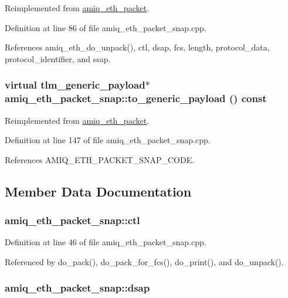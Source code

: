 Reimplemented from \hyperlink{classamiq__eth__packet_a909eb3860185125564fa530496ed1c9e}{amiq\_\-eth\_\-packet}.

Definition at line 86 of file amiq\_\-eth\_\-packet\_\-snap.cpp.

References amiq\_\-eth\_\-do\_\-unpack(), ctl, dsap, fcs, length, protocol\_\-data, protocol\_\-identifier, and ssap.\hypertarget{classamiq__eth__packet__snap_a99256008f171d933ec625d7957b64270}{
\subsubsection[{to\_\-generic\_\-payload}]{\setlength{\rightskip}{0pt plus 5cm}virtual tlm\_\-generic\_\-payload$\ast$ amiq\_\-eth\_\-packet\_\-snap::to\_\-generic\_\-payload () const}}
\label{classamiq__eth__packet__snap_a99256008f171d933ec625d7957b64270}


Reimplemented from \hyperlink{classamiq__eth__packet_a6dd92751d8172eeaa347d71bb415b0d5}{amiq\_\-eth\_\-packet}.

Definition at line 147 of file amiq\_\-eth\_\-packet\_\-snap.cpp.

References AMIQ\_\-ETH\_\-PACKET\_\-SNAP\_\-CODE.

\subsection{Member Data Documentation}
\hypertarget{classamiq__eth__packet__snap_ae4146189e20b5d48c0563c0fa575b578}{
\subsubsection[{ctl}]{ {\bf amiq\_\-eth\_\-packet\_\-snap::ctl}}}
\label{classamiq__eth__packet__snap_ae4146189e20b5d48c0563c0fa575b578}


Definition at line 46 of file amiq\_\-eth\_\-packet\_\-snap.cpp.

Referenced by do\_\-pack(), do\_\-pack\_\-for\_\-fcs(), do\_\-print(), and do\_\-unpack().\hypertarget{classamiq__eth__packet__snap_a3472137088bb7bc9085610f4f848527f}{
\subsubsection[{dsap}]{ {\bf amiq\_\-eth\_\-packet\_\-snap::dsap}}}
\label{classamiq__eth__packet__snap_a3472137088bb7bc9085610f4f848527f}


